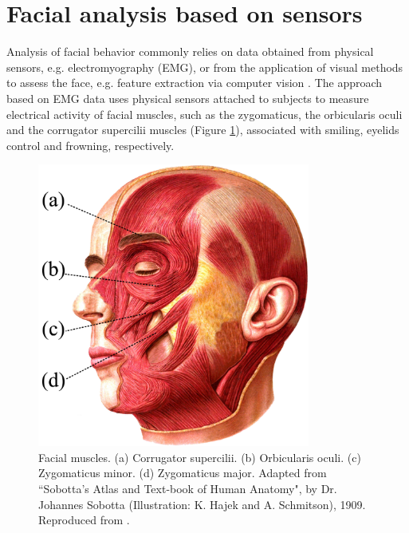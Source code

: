 \section{Facial analysis based on sensors}

Analysis of facial behavior commonly relies on data obtained from physical sensors, e.g. electromyography (EMG), or from the application of visual methods to assess the face, e.g. feature extraction via computer vision \parencite{schrader2017rising}. The approach based on EMG data uses physical sensors attached to subjects to measure electrical activity of facial muscles, such as the zygomaticus, the orbicularis oculi and the corrugator supercilii muscles (Figure \ref{fig:face-muscles}), associated with smiling, eyelids control and frowning, respectively.

\begin{figure}[h!]
\centering
\includegraphics[width=0.8\textwidth]{Content/figures/face-muscles.jpg}
\caption{Facial muscles. (a) Corrugator supercilii. (b) Orbicularis oculi. (c) Zygomaticus minor. (d) Zygomaticus major. Adapted from ``Sobotta's Atlas and Text-book of Human Anatomy", by Dr. Johannes Sobotta (Illustration: K. Hajek and A. Schmitson), 1909. Reproduced from \parencite{sobotta1909wikimedia}.}
\label{fig:face-muscles}
\end{figure}

